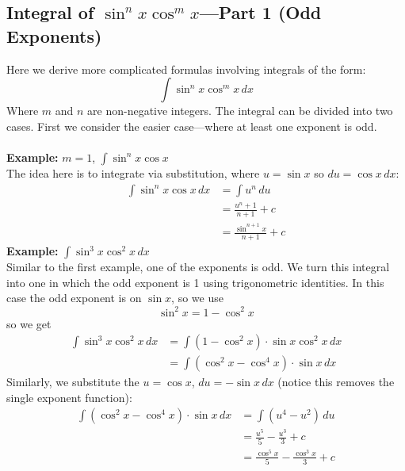 \documentclass{report}
\begin{document}
\subsection{Integral of $\sin^nx\cos^mx$---Part 1 (Odd Exponents)} %
Here we derive more complicated formulas involving integrals of the form:
\begin{equation*}
\int\sin^nx\cos^mx\,dx
\end{equation*}
Where $m$ and $n$ are non-negative integers. The integral can be divided into two
cases. First we consider the easier case---where at least one exponent is odd.\\
\vspace{1mm}\\
\textbf{Example:} $m=1$, $\int\sin^nx\cos x$\\
The idea here is to integrate via substitution, where $u=\sin x$ so $du=\cos x\,dx$:
\begin{align*}
\int\sin^nx\cos x\,dx&=\int u^n\,du\\
&=\frac{u^n+1}{n+1}+c\\
&=\frac{\sin^{n+1}x}{n+1}+c
\end{align*}
\textbf{Example:} $\int\sin^3x\cos^2x\,dx$\\
Similar to the first example, one of the exponents is odd. We turn this integral into
one in which the odd exponent is 1 using trigonometric identities. In this case the 
odd exponent is on $\sin x$, so we use
\begin{equation*}
\sin^2x=1-\cos^2x
\end{equation*}
so we get
\begin{align*}
\int\sin^3x\cos^2x\,dx&=\int(1-\cos^2x)\cdot
\sin x\cos^2x\,dx\\
&=\int(\cos^2x-\cos^4x)\cdot\sin x\,dx
\end{align*}
Similarly, we substitute the $u=\cos x$, $du=-\sin x\,dx$ (notice this removes the single exponent function):
\begin{align*}
\int(\cos^2x-\cos^4x)\cdot\sin x\,dx
&=\int(u^4-u^2)\,du\\
&=\frac{u^5}{5}-\frac{u^3}{3}+c\\
&=\frac{\cos^5x}{5}-\frac{\cos^3x}{3}+c
\end{align*}
\newpage
\end{document}

